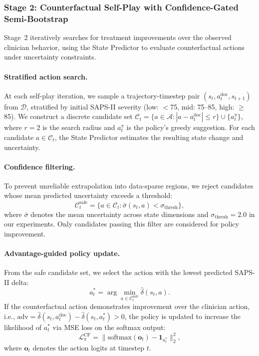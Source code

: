 \subsubsection{Stage 2: Counterfactual Self-Play with Confidence-Gated Semi-Bootstrap}
\label{sec:stage2}

Stage~2 iteratively searches for treatment improvements over the observed clinician behavior, using the State Predictor to evaluate counterfactual actions under uncertainty constraints.

\paragraph{Stratified action search.} At each self-play iteration, we sample a trajectory-timestep pair $(s_t, a_t^{\text{doc}}, s_{t+1})$ from $\mathcal{D}$, stratified by initial SAPS-II severity (low: $<$75, mid: 75--85, high: $\geq$85). We construct a discrete candidate set $\mathcal{C}_t = \{a \in \mathcal{A} : |a - a_t^{\text{doc}}| \leq r\} \cup \{a_t^{\pi}\}$, where $r = 2$ is the search radius and $a_t^{\pi}$ is the policy's greedy suggestion. For each candidate $a \in \mathcal{C}_t$, the State Predictor estimates the resulting state change and uncertainty.

\paragraph{Confidence filtering.} To prevent unreliable extrapolation into data-sparse regions, we reject candidates whose mean predicted uncertainty exceeds a threshold:
\begin{equation}
    \mathcal{C}_t^{\text{safe}} = \bigl\{a \in \mathcal{C}_t : \bar{\sigma}(s_t, a) < \sigma_{\text{thresh}}\bigr\},
\end{equation}
where $\bar{\sigma}$ denotes the mean uncertainty across state dimensions and $\sigma_{\text{thresh}} = 2.0$ in our experiments. Only candidates passing this filter are considered for policy improvement.

\paragraph{Advantage-guided policy update.} From the safe candidate set, we select the action with the lowest predicted SAPS-II delta:
\begin{equation}
    a_t^* = \arg\min_{a \in \mathcal{C}_t^{\text{safe}}} \hat{\delta}(s_t, a).
\end{equation}
If the counterfactual action demonstrates improvement over the clinician action, i.e., $\text{adv} = \hat{\delta}(s_t, a_t^{\text{doc}}) - \hat{\delta}(s_t, a_t^*) > 0$, the policy is updated to increase the likelihood of $a_t^*$ via MSE loss on the softmax output:
\begin{equation}
    \mathcal{L}_{\pi}^{\text{CF}} = \bigl\|\text{softmax}(\mathbf{o}_t) - \mathbf{1}_{a_t^*}\bigr\|_2^2,
\end{equation}
where $\mathbf{o}_t$ denotes the action logits at timestep $t$.

